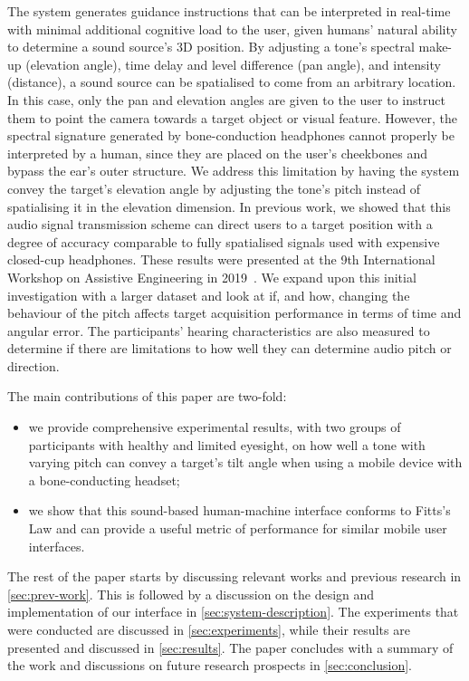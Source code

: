 \documentclass[acmsmall]{acmart}
\begin{document}
The system generates guidance instructions that can be interpreted in real-time with minimal additional cognitive load to the user, given humans' natural ability to determine a sound source's 3D position.
By adjusting a tone's spectral make-up (elevation angle), time delay and level difference (pan angle), and intensity (distance), a sound source can be spatialised to come from an arbitrary location.
In this case, only the pan and elevation angles are given to the user to instruct them to point the camera towards a target object or visual feature.
However, the spectral signature generated by bone-conduction headphones cannot properly be interpreted by a human, since they are placed on the user's cheekbones and bypass the ear's outer structure.
We address this limitation by having the system convey the target's elevation angle by adjusting the tone's pitch instead of spatialising it in the elevation dimension.
In previous work, we showed that this audio signal transmission scheme can direct users to a target position with a degree of accuracy comparable to fully spatialised signals used with expensive closed-cup headphones.
These results were presented at the 9th International Workshop on Assistive Engineering in 2019~\citep{lock2019bone}.
We expand upon this initial investigation with a larger dataset and look at if, and how, changing the behaviour of the pitch affects target acquisition performance in terms of time and angular error.
The participants' hearing characteristics are also measured to determine if there are limitations to how well they can determine audio pitch or direction. 

The main contributions of this paper are two-fold: 
\begin{itemize}
  \item we provide comprehensive experimental results, with two groups of participants with healthy and limited eyesight, on how well a tone with varying pitch can convey a target's tilt angle when using a mobile device with a bone-conducting headset; 
  \item we show that this sound-based human-machine interface conforms to Fitts's Law and can provide a useful metric of performance for similar mobile user interfaces.
\end{itemize}

The rest of the paper starts by discussing relevant works and previous research in \cref{sec:prev-work}.
This is followed by a discussion on the design and implementation of our interface in \cref{sec:system-description}.
The experiments that were conducted are discussed in \cref{sec:experiments}, while their results are presented and discussed in \cref{sec:results}.
The paper concludes with a summary of the work and discussions on future research prospects in \cref{sec:conclusion}.
\end{document}
